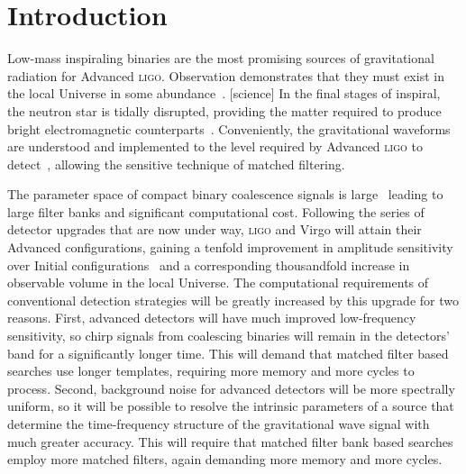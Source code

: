 \section{Introduction}
\label{sec:introduction}



Low-mass inspiraling binaries are the most promising sources of gravitational
radiation for Advanced \textsc{ligo}. Observation demonstrates that they must
exist in the local Universe in some abundance~\cite{Abadie:2010p10836}.
[science] In the
final stages of inspiral, the neutron star is tidally disrupted, providing the
matter required to produce bright electromagnetic
counterparts~\cite{shibata:2007}. Conveniently, the gravitational waveforms are
understood and implemented to the level required by Advanced \textsc{ligo} to
detect~\cite{BuonannoIyerOchsnerYiSathya2009}, allowing the sensitive technique
of matched filtering.

The parameter space of compact binary coalescence signals is
large~\cite{Owen:1995tm, Owen:1998dk} leading to large filter banks and
significant computational cost. Following the series of detector upgrades that
are now under way, \textsc{ligo} and Virgo will attain their Advanced
configurations, gaining a tenfold improvement in amplitude sensitivity over
Initial configurations~\cite{advLIGOrefdesign,advVirgorefdesign} and a
corresponding thousandfold increase in observable volume in the local Universe.
The computational requirements of conventional detection strategies will be
greatly increased by this upgrade for two reasons. First, advanced detectors
will have much improved low-frequency sensitivity, so chirp signals from
coalescing binaries will remain in the detectors' band for a significantly
longer time. This will demand that matched filter based searches use longer
templates, requiring more memory and more cycles to process. Second, background
noise for advanced detectors will be more spectrally uniform, so it will be
possible to resolve the intrinsic parameters of a source that determine the
time-frequency structure of the gravitational wave signal with much greater
accuracy. This will require that matched filter bank based searches employ
more matched filters, again demanding more memory and more cycles.

